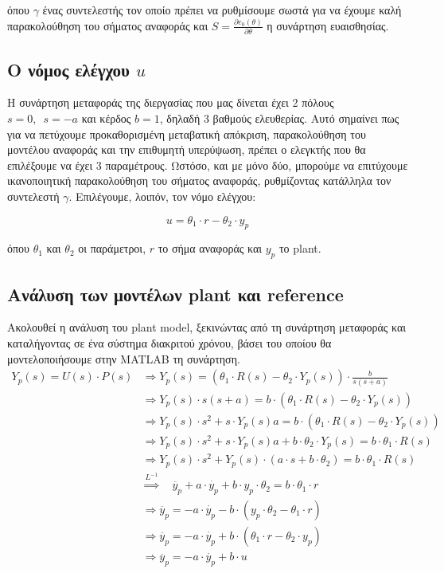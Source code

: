 \documentclass{article}
\begin{document}
\hfill\break
όπου \(\gamma\) ένας συντελεστής τον οποίο πρέπει να ρυθμίσουμε σωστά για να έχουμε καλή παρακολούθηση του σήματος αναφοράς και \(S = \frac{\partial e_0(\theta)}{\partial \theta}\) η συνάρτηση ευαισθησίας.

\subsection{Ο νόμος ελέγχου \(u\)} 
Η συνάρτηση μεταφοράς της διεργασίας που μας δίνεται έχει 2 πόλους \(s = 0,\,\,\,s = -a\) και κέρδος \(b = 1\), δηλαδή 3 βαθμούς ελευθερίας. Αυτό σημαίνει πως για να πετύχουμε προκαθορισμένη μεταβατική απόκριση, παρακολούθηση του μοντέλου αναφοράς και την επιθυμητή υπερύψωση, πρέπει ο ελεγκτής που θα επιλέξουμε να έχει 3 παραμέτρους. Ωστόσο, και με μόνο δύο, μπορούμε να επιτύχουμε ικανοποιητική παρακολούθηση του σήματος αναφοράς, ρυθμίζοντας κατάλληλα τον συντελεστή \(\gamma\). Επιλέγουμε, λοιπόν, τον νόμο ελέγχου:

\begin{equation*}
    u = \theta_1 \cdot r - \theta_2 \cdot y_p
\end{equation*}

\hfill\break
όπου \(\theta_1\) και \(\theta_2\) οι παράμετροι, \(r\) το σήμα αναφοράς και \(y_p\) το plant.

\subsection{Ανάλυση των μοντέλων plant και reference}
Ακολουθεί η ανάλυση του plant model, ξεκινώντας από τη συνάρτηση μεταφοράς και καταλήγοντας σε ένα σύστημα διακριτού χρόνου, βάσει του οποίου θα μοντελοποιήσουμε στην MATLAB τη συνάρτηση.
\begin{align*}
    Y_p(s) = U(s) \cdot P(s)
    & \Rightarrow Y_p(s) = (\theta_1 \cdot R(s) - \theta_2 \cdot Y_p(s)) \cdot \frac{b}{s(s+a)} \\
    & \Rightarrow Y_p(s) \cdot s(s+a) = b \cdot (\theta_1 \cdot R(s) - \theta_2 \cdot Y_p(s)) \\
    & \Rightarrow Y_p(s) \cdot s^2 + s \cdot Y_p(s) a = b \cdot (\theta_1 \cdot R(s) - \theta_2 \cdot Y_p(s)) \\
    & \Rightarrow Y_p(s) \cdot s^2 + s \cdot Y_p(s) a + b \cdot \theta_2 \cdot Y_p(s) = b \cdot \theta_1 \cdot R(s) \\
    & \Rightarrow Y_p(s) \cdot s^2 + Y_p(s) \cdot (a \cdot s + b \cdot \theta_2) = b \cdot \theta_1 \cdot R(s) \\
    & \overset{L^{-1}}{\Longrightarrow} \quad \ddot{y_p} + a \cdot \dot{y_p} + b \cdot y_p \cdot \theta_2 = b \cdot \theta_1 \cdot r \\
    & \Rightarrow \ddot{y_p} = -a \cdot \dot{y_p} - b \cdot (y_p \cdot \theta_2 - \theta_1 \cdot r) \\
    & \Rightarrow \ddot{y_p} = -a \cdot \dot{y_p} + b \cdot (\theta_1 \cdot r - \theta_2 \cdot y_p) \\
    & \Rightarrow \ddot{y_p} = -a \cdot \dot{y_p} + b \cdot u
\end{align*}
\end{document}

